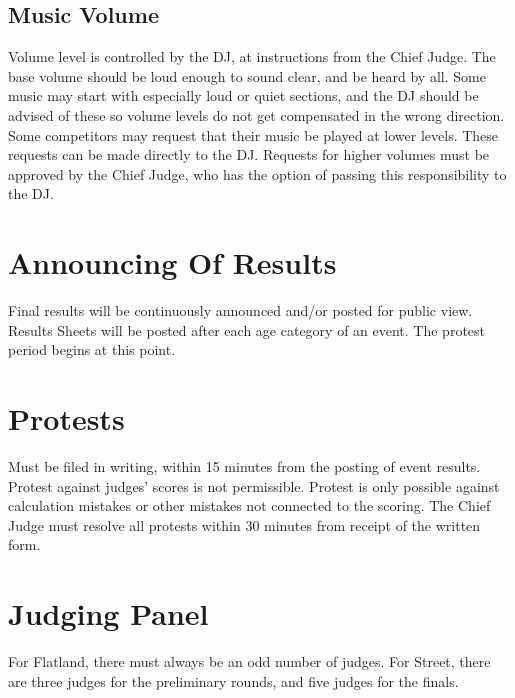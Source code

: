 \subsection{Music Volume}
Volume level is controlled by the DJ, at instructions from the Chief Judge.
The base volume should be loud enough to sound clear, and be heard by all.
Some music may start with especially loud or quiet sections, and the DJ should be advised of these so volume levels do not get compensated in the wrong direction.
Some competitors may request that their music be played at lower levels.
These requests can be made directly to the DJ.
Requests for higher volumes must be approved by the Chief Judge, who has the option of passing this responsibility to the DJ.

\section{Announcing Of Results}
Final results will be continuously announced and/or posted for public view.
Results Sheets will be posted after each age category of an event.
The protest period begins at this point.

\section{Protests}
Must be filed in writing, within 15 minutes from the posting of event results.
Protest against judges' scores is not permissible.
Protest is only possible against calculation mistakes or other mistakes not connected to the scoring.
The Chief Judge must resolve all protests within 30 minutes from receipt of the written form.

\section{Judging Panel}
For Flatland, there must always be an odd number of judges.
For Street, there are three judges for the preliminary rounds, and five judges for the finals.

